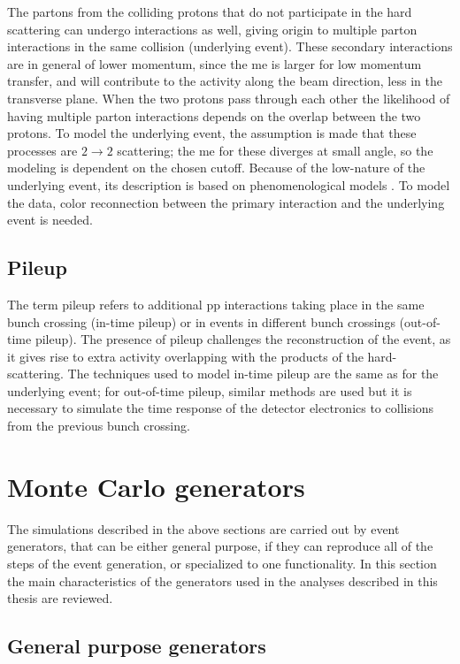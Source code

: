 The partons from the colliding protons that do not participate in the hard scattering can undergo interactions as well, giving origin to multiple parton interactions in the same collision (underlying event).
These secondary interactions are in general of lower momentum, since the \gls{me} is larger for low momentum transfer, and will contribute to the activity along the beam direction, less in the transverse plane. 
When the two protons pass through each other the likelihood of having multiple parton interactions depends on the overlap between the two protons. 
To model the underlying event, the assumption is made that these processes are $2\rightarrow2$ scattering; the \gls{me} for these diverges at small angle, so the modeling is dependent on the chosen \pt cutoff. 
Because of the low-\pt nature of the underlying event, its description is based on phenomenological models \cite{ATL-PHYS-PUB-2014-021,Skands:2010ak}.
To model the data, color reconnection between the primary interaction and the underlying event is needed. 

\subsection{Pileup}

The term pileup refers to additional \gls{pp} interactions taking place in the same bunch crossing (in-time pileup) or in events in different bunch crossings (out-of-time pileup). 
The presence of pileup challenges the reconstruction of the event, as it gives rise to extra activity overlapping with the products of the hard-scattering. The techniques used to model in-time pileup are the same as for the underlying event; 
for out-of-time pileup, similar methods are used but it is necessary to simulate the time response of the detector electronics to collisions from the previous bunch crossing. 

\section{Monte Carlo generators}
\label{sec:mcgen}

The simulations described in the above sections are carried out by event generators, that can be either general purpose, 
if they can reproduce all of the steps of the event generation, or specialized to one functionality. 
In this section the main characteristics of the generators used in the analyses described in this thesis are reviewed.

\subsection{General purpose generators}

